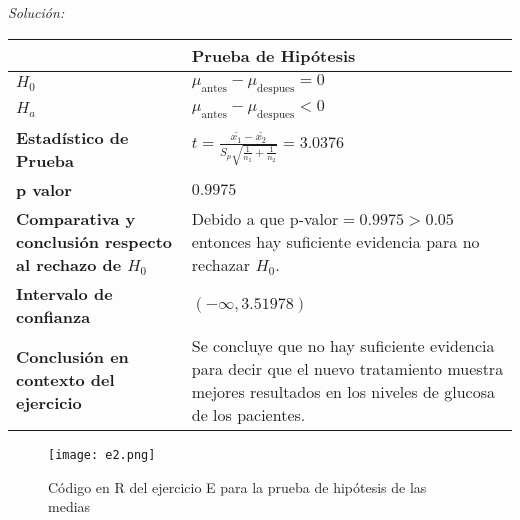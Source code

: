 \documentclass[12pt]{article}
\newenvironment{sol}
    {\emph{Solución:}
    }
    {
    }
\begin{document}
\begin{sol}
\begin{table}[h!]
\centering
\begin{tabular}{|>{\raggedright\arraybackslash}m{6cm}|>{\raggedright\arraybackslash}m{6cm}|}
\hline
 & \textbf{Prueba de Hipótesis} \\ \hline
$H_0$ & $\mu_{\text{antes}}-\mu_{\text{despues}}=0$ \\ \hline
$H_a$ & $\mu_{\text{antes}}-\mu_{\text{despues}}<0$ \\ \hline
\textbf{Estadístico de Prueba} & \vspace{0.5cm}$t=\frac{\bar{x_1}-\bar{x_2}}{S_p\sqrt{\frac{1}{n_1}+\frac{1}{n_2}}}=3.0376$\vspace{0.5cm} \\ \hline
\textbf{p valor} & $0.9975$ \\ \hline
\textbf{Comparativa y conclusión respecto al rechazo de $H_0$} & Debido a que p-valor$=0.9975>0.05$ entonces hay suficiente evidencia para no rechazar $H_0$. \\ \hline
\textbf{Intervalo de confianza} & $(-\infty, 3.51978)$ \\ \hline
\textbf{Conclusión en contexto del ejercicio} & Se concluye que no hay suficiente evidencia para decir que el nuevo tratamiento muestra mejores resultados en los niveles de glucosa de los pacientes. \\ \hline
\end{tabular}
\label{tab:hipotesis}
\end{table}
\pagebreak

\begin{figure}[h]  %
    \centering      %
    \texttt{[image: e2.png]} 
    \caption{Código en R del ejercicio E para la prueba de hipótesis de las medias}
\end{figure}


\end{sol}

\end{document}
